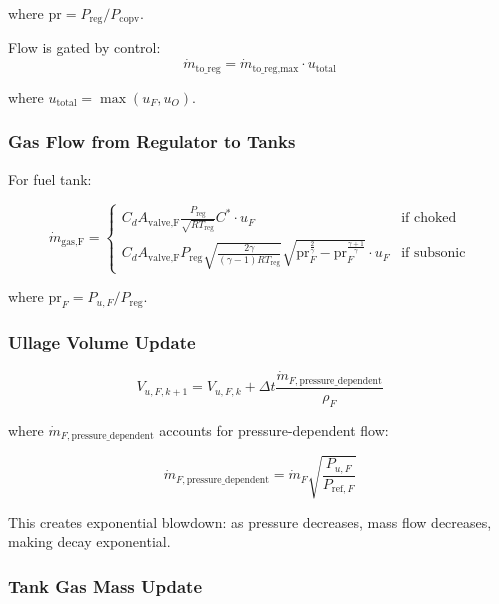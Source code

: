 \documentclass[11pt,a4paper]{article}
\begin{document}
where $\text{pr} = P_{\text{reg}}/P_{\text{copv}}$.

Flow is gated by control:
\begin{equation}
\dot{m}_{\text{to\_reg}} = \dot{m}_{\text{to\_reg},\text{max}} \cdot u_{\text{total}}
\end{equation}

where $u_{\text{total}} = \max(u_F, u_O)$.

\subsubsection{Gas Flow from Regulator to Tanks}

For fuel tank:

\begin{equation}
\dot{m}_{\text{gas,F}} = \begin{cases}
C_d A_{\text{valve,F}} \frac{P_{\text{reg}}}{\sqrt{R T_{\text{reg}}}} C^* \cdot u_F & \text{if choked} \\
C_d A_{\text{valve,F}} P_{\text{reg}} \sqrt{\frac{2\gamma}{(\gamma-1)RT_{\text{reg}}}} \sqrt{\text{pr}_F^{\frac{2}{\gamma}} - \text{pr}_F^{\frac{\gamma+1}{\gamma}}} \cdot u_F & \text{if subsonic}
\end{cases}
\end{equation}

where $\text{pr}_F = P_{u,F}/P_{\text{reg}}$.

\subsubsection{Ullage Volume Update}

\begin{equation}
V_{u,F,k+1} = V_{u,F,k} + \Delta t \frac{\dot{m}_{F,\text{pressure\_dependent}}}{\rho_F}
\end{equation}

where $\dot{m}_{F,\text{pressure\_dependent}}$ accounts for pressure-dependent flow:

\begin{equation}
\dot{m}_{F,\text{pressure\_dependent}} = \dot{m}_F \sqrt{\frac{P_{u,F}}{P_{\text{ref},F}}}
\end{equation}

This creates exponential blowdown: as pressure decreases, mass flow decreases, making decay exponential.

\subsubsection{Tank Gas Mass Update}
\end{document}
